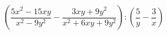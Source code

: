\begin{ex}[type=expression]
	\begin{condition}
		\( \left( \dfrac{5x^2-15xy}{x^2-9y^2}-\dfrac{3xy+9y^2}{x^2+6xy+9y^2} \right) :\left( \dfrac{5}{y}-\dfrac{3}{x} \right)\)
	\end{condition}
\end{ex}